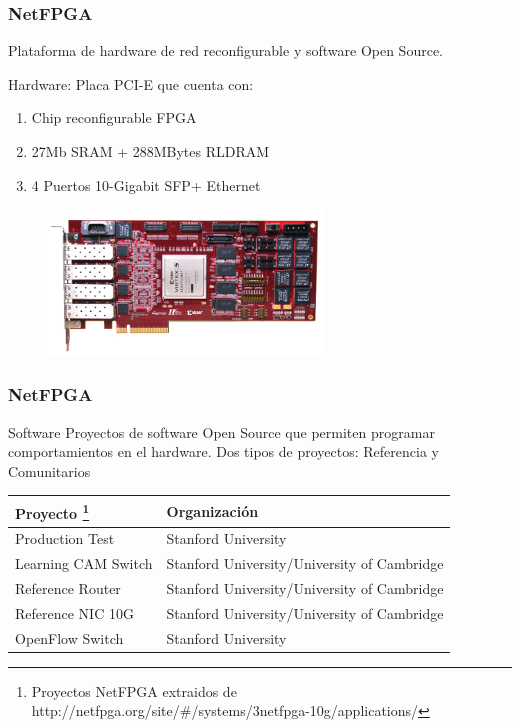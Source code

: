 \documentclass{beamer}
\begin{document}
\begin{frame}
\frametitle{NetFPGA} 


	Plataforma de hardware de red reconfigurable y software Open Source.



		Hardware: Placa PCI-E que cuenta con: 
		\begin{enumerate}
			\item Chip reconfigurable FPGA 
			\item 27Mb SRAM + 288MBytes RLDRAM
			\item 4 Puertos 10-Gigabit SFP+ Ethernet
		\end{enumerate}
		
	\begin{figure}[H]
		\centering
		\includegraphics[width=0.65\textwidth]{imagenes/NetFPGA10G_web.jpg}
	\end{figure}


\end{frame}


\begin{frame}
\frametitle{NetFPGA} 
\begin{block}{Software}
Proyectos de software Open Source que permiten programar comportamientos en el hardware. Dos tipos de proyectos: Referencia y Comunitarios

\end{block}

\begin{table}[]
\small
\centering
\label{label}
\begin{tabular}{| p{3.7cm} | p{6.8cm} |}

\hline
\multicolumn{1}{|l|}{Proyecto \footnote[frame]{\tiny Proyectos NetFPGA extraidos de http://netfpga.org/site/\#/systems/3netfpga-10g/applications/}} & \multicolumn{1}{l|}{Organizaci\'on}\\
\hline
Production Test  & Stanford University \\
Learning CAM Switch &  Stanford University/University of Cambridge \\
Reference Router  &  Stanford University/University of Cambridge  \\
Reference NIC 10G  &  Stanford University/University of Cambridge  \\
\hline
OpenFlow Switch & Stanford University  \\
\hline  
\end{tabular}
\end{table}


\end{frame}
\end{document}
